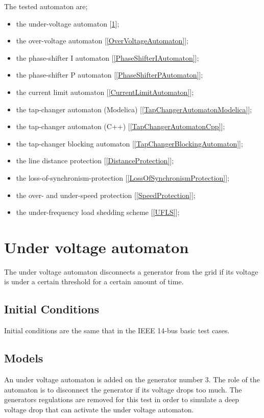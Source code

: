 \documentclass[a4paper, 12pt]{report}
\begin{document}
The tested automaton are;
\begin{itemize}
\item the under-voltage automaton [\ref{UnderVoltageAutomaton}];
\item the over-voltage automaton [\ref{OverVoltageAutomaton}];
\item the phase-shifter I automaton [\ref{PhaseShifterIAutomaton}];
\item the phase-shifter P automaton [\ref{PhaseShifterPAutomaton}];
\item the current limit automaton [\ref{CurrentLimitAutomaton}];
\item the tap-changer automaton (Modelica) [\ref{TapChangerAutomatonModelica}];
\item the tap-changer automaton (C++) [\ref{TapChangerAutomatonCpp}];
\item the tap-changer blocking automaton [\ref{TapChangerBlockingAutomaton}];
\item the line distance protection [\ref{DistanceProtection}];
\item the loss-of-synchronism-protection [\ref{LossOfSynchronismProtection}];
\item the over- and under-speed protection [\ref{SpeedProtection}];
\item the under-frequency load shedding scheme [\ref{UFLS}];
\end{itemize}


\newpage
\section{Under voltage automaton}
\label{UnderVoltageAutomaton}

The under voltage automaton disconnects a generator from the grid if its voltage is under a certain threshold for a certain amount of time.

\subsection{Initial Conditions}

Initial conditions are the same that in the IEEE 14-bus basic test cases.

\subsection{Models}

An under voltage automaton is added on the generator number 3. The role of the automaton is to disconnect the generator if its voltage drops too much. The generators regulations are removed for this test in order to simulate a deep voltage drop that can activate the under voltage automaton.\\
\end{document}
